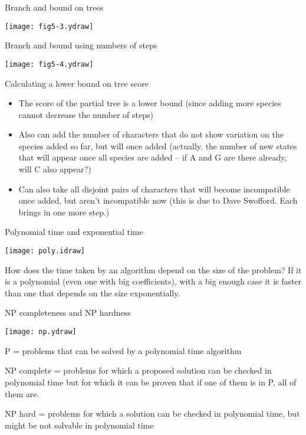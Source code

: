 \documentclass[bluish,slideColor,colorBG,pdf]{prosper}
\begin{document}
\begin{slide}[Replace]{Branch and bound on trees}

\centerline{\texttt{[image: fig5-3.ydraw]}}

\end{slide}

\begin{slide}[Replace]{Branch and bound using numbers of steps}

\centerline{\texttt{[image: fig5-4.ydraw]}}

\end{slide}

\begin{slide}[Replace]{Calculating a lower bound on tree score}

\begin{itemize}
\item The score of the partial tree is a lower bound (since adding
more species cannot decrease the number of steps)
\medskip

\item Also can add the number of characters that do not show variation
on the species added so far, but will once added (actually, the number
of new states that will appear once all species are added -- if A and G
are there already, will C also appear?)
\medskip

\item Can also take all disjoint pairs of characters that will become
incompatible once added, but aren't incompatible now (this is due to
Dave Swofford.  Each brings in one more step.)
\end{itemize}

\end{slide}

\begin{slide}[Replace]{Polynomial time and exponential time}

\centerline{\texttt{[image: poly.idraw]}}
\bigskip

How does the time taken by an algorithm depend on the size of the
problem?  If it is a polynomial (even one with big coefficients),
with a big enough case it is faster than one that depends on the
size exponentially.

\end{slide}

\begin{slide}[Replace]{NP completeness and NP hardness}

\centerline{\texttt{[image: np.ydraw]}}
\bigskip

P = problems that can be solved by a polynomial time algorithm
\medskip

NP complete = problems for which a proposed solution can be checked in
polynomial time but for which it can be proven that if one of them is in
P, all of them are.
\medskip

NP hard = problems for which a solution can be checked in polynomial
time, but might be not solvable in polynomial time

\end{slide}
\end{document}
